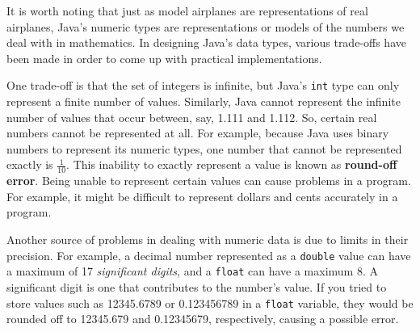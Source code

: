 
It is worth noting that just as model airplanes are representations of
real airplanes, Java's numeric types are representations or
models of the numbers we deal with in mathematics.  In designing
Java's data types, various trade-offs have been made in order to come
up with practical implementations.

One trade-off is that the set of integers is infinite, but Java's
{\tt int} type can only represent a finite number of values.   Similarly,
Java cannot \mbox{represent} the infinite number of values that occur
between, say, 1.111 and 1.112. So, certain real numbers cannot be
represented at all.  For example, because Java uses binary numbers to
represent its numeric types, one number that cannot be represented
exactly is $\frac{1}{10}$. This inability to exactly represent a value
is known as {\bf round-off error}.  Being unable to represent certain
values can cause problems in a program. For example, it might be
difficult to represent dollars and cents accurately in a program.

Another source of problems in dealing with numeric data is due to
limits in their precision. For example, a decimal number represented
as a \mbox{\tt double} value can have a maximum of 17 {\it significant
digits}, and a {\tt float} can have a maximum 8. A significant digit
is one that contributes to the number's value.  If you tried to store
values such as 12345.6789 or 0.123456789 in a {\tt float} variable,
they would be rounded off to 12345.679 and 0.12345679, respectively,
causing a possible error.



